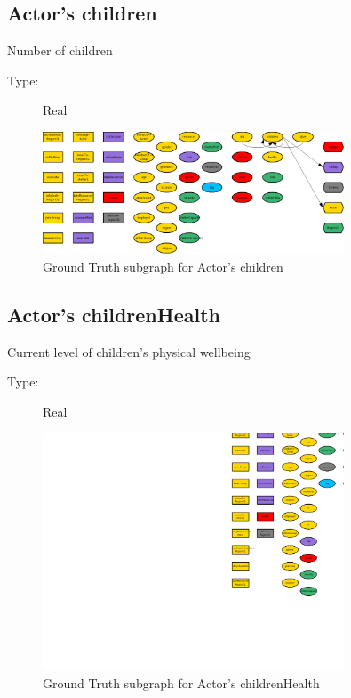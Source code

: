 \documentclass{article}%
\begin{document}
%
\subsection{Actor's children}%
\label{subsec:Actor's children}%
Number of children%
\begin{description}%
\item[Type:]%
Real%
\end{description}%


\begin{figure}[ht]%
\centering%
\includegraphics[width=0.8\textwidth]{images/childrenOfActor.png}%
\caption{Ground Truth subgraph for Actor's children}%
\end{figure}

%
\subsection{Actor's childrenHealth}%
\label{subsec:Actor's childrenHealth}%
Current level of children's physical wellbeing%
\begin{description}%
\item[Type:]%
Real%
\end{description}%


\begin{figure}[ht]%
\centering%
\includegraphics[width=0.8\textwidth]{images/childrenHealthOfActor.png}%
\caption{Ground Truth subgraph for Actor's childrenHealth}%
\end{figure}
\end{document}
